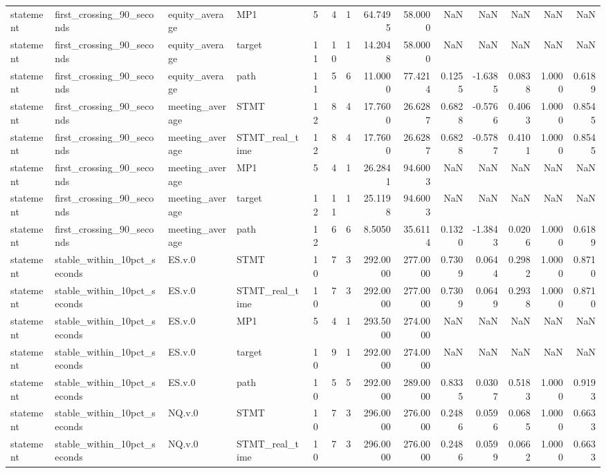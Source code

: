 \begin{tabular}{llllrrrrrrrrrr}
statement & first_crossing_90_seconds & equity_average & MP1 & 5 & 4 & 1 & 64.7495 & 58.0000 & NaN & NaN & NaN & NaN & NaN \\
statement & first_crossing_90_seconds & equity_average & target & 11 & 10 & 1 & 14.2048 & 58.0000 & NaN & NaN & NaN & NaN & NaN \\
statement & first_crossing_90_seconds & equity_average & path & 11 & 5 & 6 & 11.0000 & 77.4214 & 0.1255 & -1.6385 & 0.0838 & 1.0000 & 0.6189 \\
statement & first_crossing_90_seconds & meeting_average & STMT & 12 & 8 & 4 & 17.7600 & 26.6287 & 0.6828 & -0.5766 & 0.4063 & 1.0000 & 0.8545 \\
statement & first_crossing_90_seconds & meeting_average & STMT_real_time & 12 & 8 & 4 & 17.7600 & 26.6287 & 0.6828 & -0.5787 & 0.4101 & 1.0000 & 0.8545 \\
statement & first_crossing_90_seconds & meeting_average & MP1 & 5 & 4 & 1 & 26.2841 & 94.6003 & NaN & NaN & NaN & NaN & NaN \\
statement & first_crossing_90_seconds & meeting_average & target & 12 & 11 & 1 & 25.1198 & 94.6003 & NaN & NaN & NaN & NaN & NaN \\
statement & first_crossing_90_seconds & meeting_average & path & 12 & 6 & 6 & 8.5050 & 35.6114 & 0.1320 & -1.3843 & 0.0206 & 1.0000 & 0.6189 \\
statement & stable_within_10pct_seconds & ES.v.0 & STMT & 10 & 7 & 3 & 292.0000 & 277.0000 & 0.7309 & 0.0644 & 0.2982 & 1.0000 & 0.8710 \\
statement & stable_within_10pct_seconds & ES.v.0 & STMT_real_time & 10 & 7 & 3 & 292.0000 & 277.0000 & 0.7309 & 0.0649 & 0.2938 & 1.0000 & 0.8710 \\
statement & stable_within_10pct_seconds & ES.v.0 & MP1 & 5 & 4 & 1 & 293.5000 & 274.0000 & NaN & NaN & NaN & NaN & NaN \\
statement & stable_within_10pct_seconds & ES.v.0 & target & 10 & 9 & 1 & 292.0000 & 274.0000 & NaN & NaN & NaN & NaN & NaN \\
statement & stable_within_10pct_seconds & ES.v.0 & path & 10 & 5 & 5 & 292.0000 & 289.0000 & 0.8335 & 0.0307 & 0.5183 & 1.0000 & 0.9193 \\
statement & stable_within_10pct_seconds & NQ.v.0 & STMT & 10 & 7 & 3 & 296.0000 & 276.0000 & 0.2486 & 0.0596 & 0.0685 & 1.0000 & 0.6633 \\
statement & stable_within_10pct_seconds & NQ.v.0 & STMT_real_time & 10 & 7 & 3 & 296.0000 & 276.0000 & 0.2486 & 0.0599 & 0.0662 & 1.0000 & 0.6633 \\

\end{tabular}
